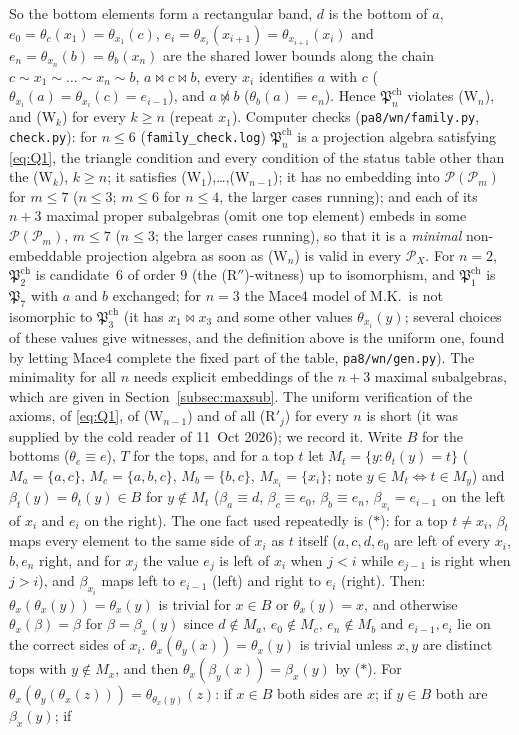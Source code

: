 \documentclass[11pt]{amsart}
\theoremstyle{definition}
\renewcommand{\P}{\mathcal{P}}
\newcommand{\mt}{\bowtie}   %
\begin{document}
So the bottom elements form a rectangular band, $d$ is the bottom of $a$, $e_0=\theta_c(x_1)=\theta_{x_1}(c)$, $e_i=\theta_{x_i}(x_{i+1})=\theta_{x_{i+1}}(x_i)$ and $e_n=\theta_{x_n}(b)=\theta_b(x_n)$ are the shared lower bounds along the chain $c\sim x_1\sim\dots\sim x_n\sim b$, $a\mt c\mt b$, every $x_i$ identifies $a$ with $c$ ($\theta_{x_i}(a)=\theta_{x_i}(c)=e_{i-1}$), and $a\not\mt b$ ($\theta_b(a)=e_n$). Hence $\mathfrak P^{\mathrm{ch}}_n$ violates (W$_n$), and (W$_k$) for every $k\ge n$ (repeat $x_1$). Computer checks (\texttt{pa8/wn/family.py}, \texttt{check.py}): for $n\le6$ (\texttt{family\_check.log}) $\mathfrak P^{\mathrm{ch}}_n$ is a projection algebra satisfying \eqref{eq:Q1}, the triangle condition and every condition of the status table other than the (W$_k$), $k\ge n$; it satisfies (W$_1$),\dots,(W$_{n-1}$); it has no embedding into $\P(\P_m)$ for $m\le7$ ($n\le3$; $m\le6$ for $n\le4$, the larger cases running); and each of its $n+3$ maximal proper subalgebras (omit one top element) embeds in some $\P(\P_m)$, $m\le7$ ($n\le3$; the larger cases running), so that it is a \emph{minimal} non-embeddable projection algebra as soon as (W$_n$) is valid in every $\P_X$. For $n=2$, $\mathfrak P^{\mathrm{ch}}_2$ is candidate~$6$ of order $9$ (the (R$''$)-witness) up to isomorphism, and $\mathfrak P^{\mathrm{ch}}_1$ is $\mathfrak P_7$ with $a$ and $b$ exchanged; for $n=3$ the Mace4 model of M.K.\ is not isomorphic to $\mathfrak P^{\mathrm{ch}}_3$ (it has $x_1\mt x_3$ and some other values $\theta_{x_i}(y)$; several choices of these values give witnesses, and the definition above is the uniform one, found by letting Mace4 complete the fixed part of the table, \texttt{pa8/wn/gen.py}). The minimality for all $n$ needs explicit embeddings of the $n+3$ maximal subalgebras, which are given in Section~\ref{subsec:maxsub}. The uniform verification of the axioms, of \eqref{eq:Q1}, of (W$_{n-1}$) and of all (R$'_j$) for every $n$ is short (it was supplied by the cold reader of 11~Oct 2026); we record it. Write $B$ for the bottoms ($\theta_e\equiv e$), $T$ for the tops, and for a top $t$ let $M_t=\{y:\theta_t(y)=t\}$ ($M_a=\{a,c\}$, $M_c=\{a,b,c\}$, $M_b=\{b,c\}$, $M_{x_i}=\{x_i\}$; note $y\in M_t\Leftrightarrow t\in M_y$) and $\beta_t(y)=\theta_t(y)\in B$ for $y\notin M_t$ ($\beta_a\equiv d$, $\beta_c\equiv e_0$, $\beta_b\equiv e_n$, $\beta_{x_i}=e_{i-1}$ on the left of $x_i$ and $e_i$ on the right). The one fact used repeatedly is ($*$): for a top $t\ne x_i$, $\beta_t$ maps every element to the same side of $x_i$ as $t$ itself ($a,c,d,e_0$ are left of every $x_i$, $b,e_n$ right, and for $x_j$ the value $e_j$ is left of $x_i$ when $j<i$ while $e_{j-1}$ is right when $j>i$), and $\beta_{x_i}$ maps left to $e_{i-1}$ (left) and right to $e_i$ (right). Then: $\theta_x(\theta_x(y))=\theta_x(y)$ is trivial for $x\in B$ or $\theta_x(y)=x$, and otherwise $\theta_x(\beta)=\beta$ for $\beta=\beta_x(y)$ since $d\notin M_a$, $e_0\notin M_c$, $e_n\notin M_b$ and $e_{i-1},e_i$ lie on the correct sides of $x_i$. $\theta_x(\theta_y(x))=\theta_x(y)$ is trivial unless $x,y$ are distinct tops with $y\notin M_x$, and then $\theta_x(\beta_y(x))=\beta_x(y)$ by ($*$). For $\theta_x(\theta_y(\theta_x(z)))=\theta_{\theta_x(y)}(z)$: if $x\in B$ both sides are $x$; if $y\in B$ both are $\beta_x(y)$; if 
\end{document}
